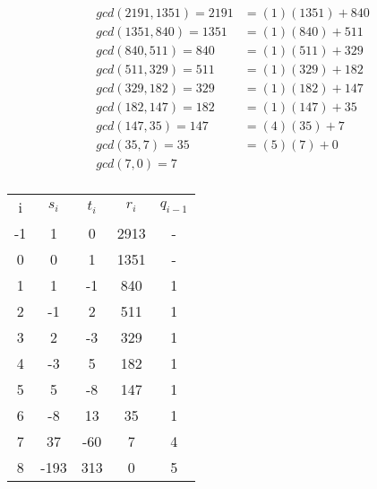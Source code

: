 \documentclass{article}
\begin{document}
\begin{align*}
   gcd(2191, 1351) = 2191 &= (1)(1351) + 840 \\
   gcd(1351, 840) = 1351 &= (1)(840) + 511 \\
   gcd(840, 511) = 840 &= (1)(511) + 329 \\
   gcd(511, 329) = 511 &= (1)(329) + 182 \\
   gcd(329, 182) = 329 &= (1)(182) + 147 \\
   gcd(182, 147) = 182 &= (1)(147) + 35 \\
   gcd(147, 35) = 147 &= (4)(35) + 7 \\
   gcd(35, 7) = 35 &= (5)(7) + 0 \\
   gcd(7, 0) = 7 \\
\end{align*}

\begin{center}
\begin{tabular}{ |c|c|c|c|c| } 
 \hline
 i & $s_{i}$ & $t_{i}$ & $r_{i}$ & $q_{i-1}$ \\ 
 -1 & 1 & 0 & 2913 & - \\ 
  0 & 0 & 1 & 1351 & - \\ 
  1 & 1 & -1 & 840 & 1 \\ 
  2 & -1 & 2 & 511 & 1 \\ 
  3 & 2 & -3 & 329 & 1 \\ 
  4 & -3 & 5 & 182 & 1 \\ 
  5 & 5 & -8 & 147 & 1 \\ 
  6 & -8 & 13 & 35 & 1 \\ 
  7 & 37 & -60 & 7 & 4 \\ 
  8 & -193 & 313 & 0 & 5 \\ 
  \hline
\end{tabular}
\end{center}
\end{document}
